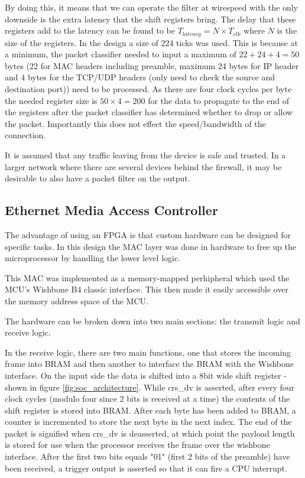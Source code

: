 By doing this, it means that we can operate the filter at wirespeed with the only downside is the extra latency that the shift registers bring. The delay that these registers add to the latency can be found to be $T_{latency} = N\times T_{clk}$ where $N$ is the size of the registers. In the design a size of 224 ticks was used. This is because at a minimum, the packet classifier needed to input a maximum of $22 + 24 + 4 = 50$ bytes (22 for MAC headers including preamble, maximum 24 bytes for IP header and 4 bytes for the TCP/UDP headers (only need to check the source and destination port)) need to be processed. As there are four clock cycles per byte the needed register size is $50 \times 4=200$ for the data to propagate to the end of the registers after the packet classifier has determined whether to drop or allow the packet. Importantly this does not effect the speed/bandwidth of the connection. 


It is assumed that any traffic leaving from the device is safe and trusted. In a larger network where there are several devices behind the firewall, it may be desirable to also have a packet filter on the output. 










\subsection{Ethernet Media Access Controller}
\label{sec:ethernet_mac}
The advantage of using an FPGA is that custom hardware can be designed for specific tasks. In this design the MAC layer was done in hardware to free up the microprocessor by handling the lower level logic. 

This MAC was implemented as a memory-mapped perhipheral which used the MCU's Wishbone B4 classic interface. This then made it easily accessible over the memory address space of the MCU.  



The hardware can be broken down into two main sections: the transmit logic and receive logic. 

In the receive logic, there are two main functions, one that stores the incoming frame into BRAM and then another to interface the BRAM with the Wishbone interface. On the input side the data is shifted into a 8bit wide shift register - shown in figure \ref{fig:soc_architecture}. While crs\_dv is asserted, after every four clock cycles (modulo four since 2 bits is received at a time) the contents of the shift register is stored into BRAM. After each byte has been added to BRAM, a counter is incremented to store the next byte in the next index. The end of the packet is signified when crs\_dv is deasserted, at which point the payload length is stored for use when the processor receives the frame over the wishbone interface. After the first two bits equals "01" (first 2 bits of the preamble) have been received, a trigger output is asserted so that it can fire a CPU interrupt.

